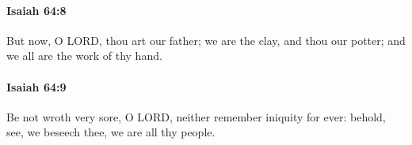 		\paragraph{Isaiah 64:8} %
			\label{ISAIAH-64-8}

			But now, O LORD, thou art our father; we are the clay, and thou our potter; and we all are the work of thy hand.


		\paragraph{Isaiah 64:9} %
			\label{ISAIAH-64-9}

			Be not wroth very sore, O LORD, neither remember iniquity for ever: behold, see, we beseech thee, we are all thy people.


